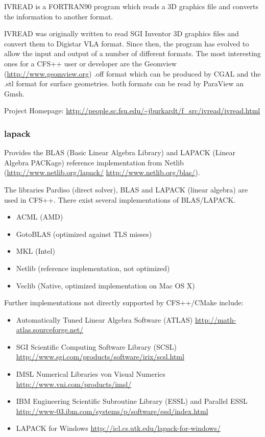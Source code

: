 IVREAD is a FORTRAN90 program which  reads a 3D graphics file and converts the
information to another format.

IVREAD  was originally  written to  read SGI  Inventor 3D  graphics  files and
convert them to  Digistar VLA format.  Since then, the  program has evolved to
allow  the  input and  output  of  a number  of  different  formats. The  most
interesting   ones  for   a  CFS++   user  or   developer  are   the  Geomview
(\url{http://www.geomview.org}) .off format which  can be produced by CGAL and
the .stl format  for surface geometries. both formats can  be read by ParaView
an Gmsh.

\noindent Project Homepage: \url{http://people.sc.fsu.edu/~jburkardt/f_src/ivread/ivread.html}

\subsubsection{lapack}
\label{sec:blas_lapack}

Provides the  BLAS (Basic Linear  Algebra Library) and LAPACK  (Linear Algebra
PACKage) reference implementation from Netlib (\url{http://www.netlib.org/lapack/}
\url{http://www.netlib.org/blas/}).

The libraries  Pardiso (direct solver),  BLAS and LAPACK (linear  algebra) are
used in CFS++. There exist several implementations of BLAS/LAPACK.

\begin{itemize}
\item ACML (AMD)
\item GotoBLAS (optimized against TLS misses)
\item MKL (Intel)
\item Netlib (reference implementation, not optimized)
\item Veclib (Native, optimized implementation on Mac OS X)
\end{itemize}

Further implementations not directly supported by CFS++/CMake include:
\begin{itemize}
\item Automatically Tuned Linear Algebra Software (ATLAS) \url{http://math-atlas.sourceforge.net/}
\item SGI Scientific Computing Software Library (SCSL) \url{http://www.sgi.com/products/software/irix/scsl.html}
\item IMSL Numerical Libraries von Visual Numerics \url{http://www.vni.com/products/imsl/}
\item IBM Engineering Scientific Subroutine Library (ESSL) and Parallel ESSL \url{http://www-03.ibm.com/systems/p/software/essl/index.html}
\item LAPACK for Windows \url{http://icl.cs.utk.edu/lapack-for-windows/}
\end{itemize}

